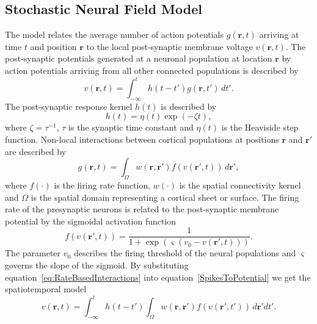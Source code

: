 \documentclass[conference,onecolumn]{IEEEtran}
\begin{document}
\subsection{Stochastic Neural Field Model}
The model relates the average number of action potentials $g(\mathbf{r},t)$ arriving at time $t$ and position $\mathbf{r}$ to the local post-synaptic membrane voltage $v(\mathbf{r},t)$. The post-synaptic potentials generated at a neuronal population at location $\mathbf{r}$ by action potentials arriving from all other connected populations is described by 
\begin{equation}
	\label{SpikesToPotential} v\left( {\mathbf{r},t} \right) = \int_{ - \infty }^t {h\left( {t - t'} \right)g\left( {\mathbf{r},t'} \right) \, dt'}. 
\end{equation}
The post-synaptic response kernel $h(t)$ is described by 
\begin{equation}
	\label{SynapticRespKernel} h(t) = \eta(t)\exp{\left(-\zeta t\right)}, 
\end{equation}
where $\zeta=\tau^{-1}$, $\tau$ is the synaptic time constant and $\eta(t)$ is the Heaviside step function. Non-local interactions between cortical populations at positions $\mathbf{r}$ and $\mathbf{r}'$ are described by 
\begin{equation}
	\label{eq:RateBasedInteractions} g\left( \mathbf{r},t \right) = \int_\Omega {w\left( \mathbf{r},\mathbf{r}' \right)f\left( v\left( \mathbf{r}',t \right) \right)\, d\mathbf{r}'}, 
\end{equation}
where $f(\cdot)$ is the firing rate function, $w(\cdot)$ is the spatial connectivity kernel and $\Omega$ is the spatial domain representing a cortical sheet or surface. The firing rate of the presynaptic neurons is related to the post-synaptic membrane potential by the sigmoidal activation function 
\begin{equation}
	\label{ActivationFunction} f\left( v\left( \mathbf{r}', t \right) \right) = \frac{1}{1 + \exp \left( \varsigma \left( v_0 - v\left(\mathbf{r}',t\right) \right) \right)}. 
\end{equation}
The parameter $v_0$ describes the firing threshold of the neural populations and $\varsigma$ governs the slope of the sigmoid. By substituting equation~\ref{eq:RateBasedInteractions} into equation~\ref{SpikesToPotential} we get the spatiotemporal model 
\begin{equation}
	\label{FullDoubleIntModel} v\left(\mathbf{r},t\right) =
	\int_{-\infty}^t 
	h\left(t - t'\right) \int_\Omega
	w\left(\mathbf{r},\mathbf{r}'\right) 
	f\left( v\left( \mathbf{r}',t' \right)\right)
	\, d\mathbf{r}'dt'.
\end{equation}
\end{document}
